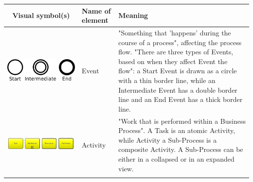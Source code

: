 \documentclass{article}
\begin{document}
\begin{longtable}{ | c | m{5cm} | m{5cm} | }
    \hline
    Visual symbol(s) & Name of element & Meaning \\ \hline
    \begin{minipage}{.3\textwidth}
      \includegraphics[width=\linewidth]{event}
    \end{minipage}
    &
   Event
    & 
   "Something that 'happens' during the course of a process", affecting the process flow. "There are three types of Events, based on when they affect
Event the flow": a Start Event is drawn as a circle with
a thin border line, while an Intermediate Event has a double border line and an End Event has a thick border line.
    \\  \hline
       \begin{minipage}{.3\textwidth}
      \includegraphics[width=\linewidth]{activity}
    \end{minipage}
    &
    Activity
    &
    "Work that is performed within a Business Process". A Task is an atomic Activity, while
Activity a Sub-Process is a composite Activity. A Sub-Process can be either in a collapsed or in an expanded view.
 \\ \hline
       \begin{minipage}{.3\textwidth}

\end{minipage}
\end{longtable}
\end{document}
